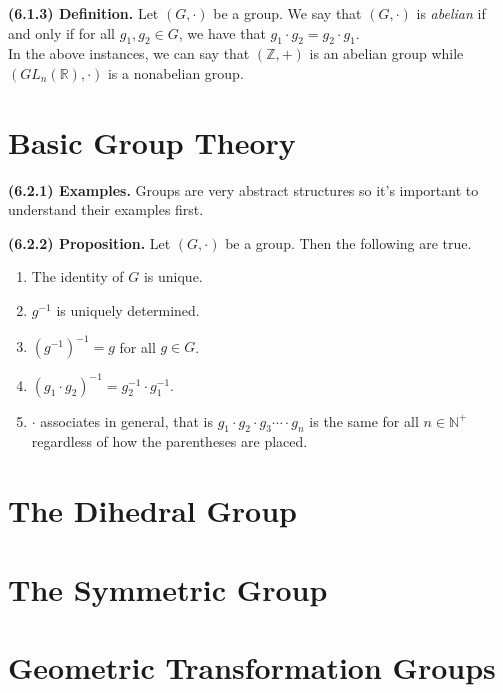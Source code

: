 \documentclass[12pt]{book}
\def\N{{\mathbb{N}}}
\def\R{{\mathbb{R}}}
\def\Z{{\mathbb{Z}}}
\def\header #1{\noindent\textbf{#1}}
\begin{document}
\header{(6.1.3) Definition.} Let $(G,\cdot)$ be a group. We say that $(G,\cdot)$ is \textit{abelian} if and only if for all $g_1,g_2\in G$, we have that $g_1\cdot g_2=g_2\cdot g_1$. \\

In the above instances, we can say that $(\Z,+)$ is an abelian group while $(GL_n(\R),\cdot)$ is a nonabelian group.

\section{Basic Group Theory}

\header{(6.2.1) Examples.}
Groups are very abstract structures so it's important to understand their examples first. 

\header{(6.2.2) Proposition.} Let $(G,\cdot)$ be a group. Then the following are true.
\begin{enumerate}
\item The identity of $G$ is unique.
\item $g^{-1}$ is uniquely determined.
\item $(g^{-1})^{-1}=g$ for all $g\in G$.
\item $(g_1\cdot g_2)^{-1}=g_2^{-1}\cdot g_1^{-1}$.
\item $\cdot$ associates in general, that is $g_1\cdot g_2\cdot g_3\cdots\cdot g_n$ is the same for all $n\in\N^+$ regardless of how the parentheses are placed.
\end{enumerate}

\section{The Dihedral Group}
\section{The Symmetric Group}
\section{Geometric Transformation Groups}
\end{document}
